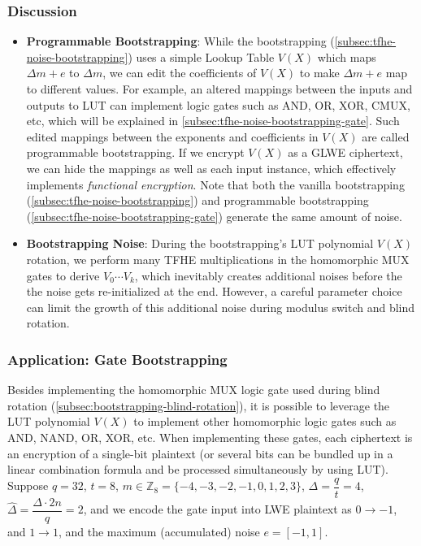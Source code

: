 \subsubsection{Discussion}
\label{subsec:tfhe-noise-bootstrapping-discussion}

\begin{itemize}
\item \textbf{Programmable Bootstrapping}: While the bootstrapping (\autoref{subsec:tfhe-noise-bootstrapping}) uses a simple Lookup Table $V(X)$ which maps $\Delta m + e$ to $\Delta m$, we can edit the coefficients of $V(X)$ to make $\Delta m + e$ map to different values. For example, an altered mappings between the inputs and outputs to LUT can implement logic gates such as AND, OR, XOR, CMUX, etc, which will be explained in \autoref{subsec:tfhe-noise-bootstrapping-gate}. Such edited mappings between the exponents and coefficients in $V(X)$ are called programmable bootstrapping. If we encrypt $V(X)$ as a GLWE ciphertext, we can hide the mappings as well as each input instance, which effectively implements \textit{functional encryption}. Note that both the vanilla bootstrapping (\autoref{subsec:tfhe-noise-bootstrapping}) and programmable bootstrapping (\autoref{subsec:tfhe-noise-bootstrapping-gate}) generate the same amount of noise. 
\item \textbf{Bootstrapping Noise}: During the bootstrapping's LUT polynomial $V(X)$ rotation, we perform many TFHE multiplications in the homomorphic MUX gates to derive $V_0 \cdots V_k$, which inevitably creates additional noises before the the noise gets re-initialized at the end. However, a careful parameter choice can limit the growth of this additional noise during modulus switch and blind rotation. 
\end{itemize}


\subsubsection{Application: Gate Bootstrapping}
\label{subsec:tfhe-noise-bootstrapping-gate}

Besides implementing the homomorphic MUX logic gate used during blind rotation (\autoref{subsec:bootstrapping-blind-rotation}), it is possible to leverage the LUT polynomial $V(X)$ to implement other homomorphic logic gates such as AND, NAND, OR, XOR, etc. When implementing these gates, each ciphertext is an encryption of a single-bit plaintext (or several bits can be bundled up in a linear combination formula and be processed simultaneously by using LUT). Suppose $q = 32$, $t = 8$, $m \in \mathbb{Z}_8 = \{-4,-3, -2,-1,0,1,2,3\}$, $\Delta = \dfrac{q}{t} = 4$, $\hat\Delta = \dfrac{\Delta\cdot 2n}{q} = 2$, and we encode the gate input into LWE plaintext as $0 \rightarrow -1$, and $1 \rightarrow 1$, and the maximum (accumulated) noise $e = [-1, 1]$. 


